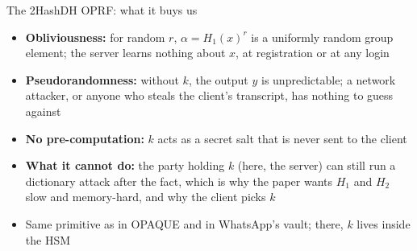 \ifdefined\PRESENTATION\else\PassOptionsToClass{handout}{beamer}\fi\documentclass[aspectratio=169, lualatex]{beamer}
\begin{document}
\begin{frame}{The 2HashDH OPRF: what it buys us}
	\begin{itemize}
		\item \textbf{Obliviousness:} for random $r$, $\alpha = H_1(x)^r$ is a uniformly random group element; the server learns nothing about $x$, at registration or at any login
		\item \textbf{Pseudorandomness:} without $k$, the output $y$ is unpredictable; a network attacker, or anyone who steals the client's transcript, has nothing to guess against
		\item \textbf{No pre-computation:} $k$ acts as a secret salt that is never sent to the client
		\item \textbf{What it cannot do:} the party holding $k$ (here, the server) can still run a dictionary attack after the fact, which is why the paper wants $H_1$ and $H_2$ slow and memory-hard, and why the client picks $k$
		\item Same primitive as in OPAQUE and in WhatsApp's vault; there, $k$ lives inside the HSM
	\end{itemize}
\end{frame}
\end{document}
